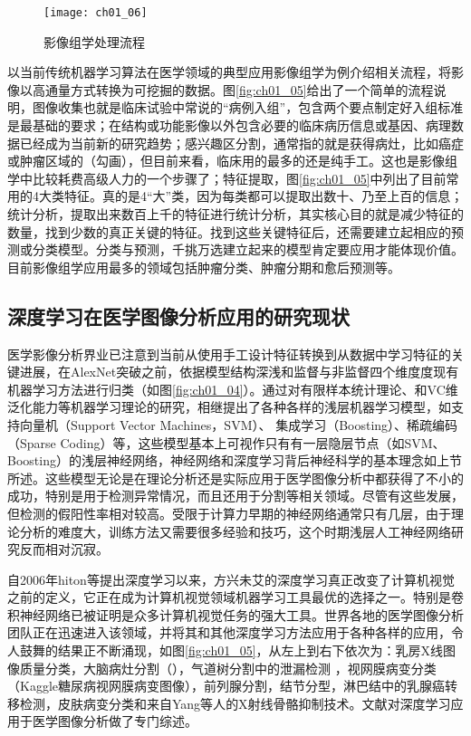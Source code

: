 \begin{figure}[!htbp]
   \centering
  \texttt{[image: ch01\_06]}
 \caption{影像组学处理流程}
\label{fig:ch01_06}
\end{figure}
以当前传统机器学习算法在医学领域的典型应用影像组学为例介绍相关流程，将影像以高通量方式转换为可挖掘的数据。图\ref{fig:ch01_05}给出了一个简单的流程说明，图像收集也就是临床试验中常说的“病例入组”，包含两个要点制定好入组标准是最基础的要求；在结构或功能影像以外包含必要的临床病历信息或基因、病理数据已经成为当前新的研究趋势；感兴趣区分割，通常指的就是获得病灶，比如癌症或肿瘤区域的（勾画），但目前来看，临床用的最多的还是纯手工。这也是影像组学中比较耗费高级人力的一个步骤了；特征提取，图\ref{fig:ch01_05}中列出了目前常用的4大类特征。真的是4“大”类，因为每类都可以提取出数十、乃至上百的信息；统计分析，提取出来数百上千的特征进行统计分析，其实核心目的就是减少特征的数量，找到少数的真正关键的特征。找到这些关键特征后，还需要建立起相应的预测或分类模型。分类与预测，千挑万选建立起来的模型肯定要应用才能体现价值。目前影像组学应用最多的领域包括肿瘤分类、肿瘤分期和愈后预测等。

\subsection{深度学习在医学图像分析应用的研究现状}

医学影像分析界业已注意到当前从使用手工设计特征转换到从数据中学习特征的关键进展，在AlexNet突破之前，依据模型结构深浅和监督与非监督四个维度度现有机器学习方法进行归类（如图\ref{fig:ch01_04}）。通过对有限样本统计理论、和VC维泛化能力等机器学习理论的研究，相继提出了各种各样的浅层机器学习模型，如支持向量机（Support Vector Machines，SVM）、 集成学习（Boosting）、稀疏编码（Sparse Coding）等，这些模型基本上可视作只有有一层隐层节点（如SVM、Boosting）的浅层神经网络，神经网络和深度学习背后神经科学的基本理念如上节所述。这些模型无论是在理论分析还是实际应用于医学图像分析中都获得了不小的成功，特别是用于检测异常情况，而且还用于分割等相关领域。尽管有这些发展，但检测的假阳性率相对较高。受限于计算力早期的神经网络通常只有几层，由于理论分析的难度大，训练方法又需要很多经验和技巧，这个时期浅层人工神经网络研究反而相对沉寂。

自2006年hiton等\citep{Hinton2006a}提出深度学习以来，方兴未艾的深度学习真正改变了计算机视觉之前的定义，它正在成为计算机视觉领域机器学习工具最优的选择之一。特别是卷积神经网络已被证明是众多计算机视觉任务的强大工具。世界各地的医学图像分析团队正在迅速进入该领域，并将其和其他深度学习方法应用于各种各样的应用，令人鼓舞的结果正不断涌现，如图\ref{fig:ch01_05}，从左上到右下依次为：乳房X线图像质量分类\citep{Sickles2006Use}，大脑病灶分割（\citep{Abr2016Improved}），气道树分割中的泄漏检测 \citep{Charbonnier2016Improving}，视网膜病变分类（Kaggle糖尿病视网膜病变图像）\citep{Grinsven2016Fast}，前列腺分割，结节分型，淋巴结中的乳腺癌转移检测，皮肤病变分类\citep{Esteva2017Dermatologist}和来自Yang等人\citep{Yang2016Cascade}的X射线骨骼抑制技术。文献\citep{Litjens2017Asurvey,Shen2017a,Greenspan2016}对深度学习应用于医学图像分析做了专门综述。

